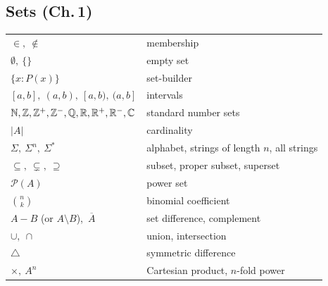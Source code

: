 \documentclass[11pt]{article}
\begin{document}
\subsection*{Sets (Ch.\,1)}
\begin{longtable}{ll}
$\in,\ \notin$ & membership \\
$\emptyset,\ \{\}$ & empty set \\
$\{x : P(x)\}$ & set-builder \\
$[a,b],\ (a,b),\ [a,b),\ (a,b]$ & intervals \\
$\mathbb{N},\mathbb{Z},\mathbb{Z}^+,\mathbb{Z}^-,\mathbb{Q},\mathbb{R},\mathbb{R}^+,\mathbb{R}^-,\mathbb{C}$ & standard number sets \\
$|A|$ & cardinality \\
$\Sigma,\ \Sigma^n,\ \Sigma^*$ & alphabet, strings of length $n$, all strings \\
$\subseteq,\ \subsetneq,\ \supseteq$ & subset, proper subset, superset \\
$\mathcal P(A)$ & power set \\
$\binom{n}{k}$ & binomial coefficient \\
$A-B$ (or $A\setminus B$),\ $\overline{A}$ & set difference, complement \\
$\cup,\ \cap$ & union, intersection \\
$\triangle$ & symmetric difference \\
$\times,\ A^n$ & Cartesian product, $n$-fold power \\
\end{longtable}
\end{document}
